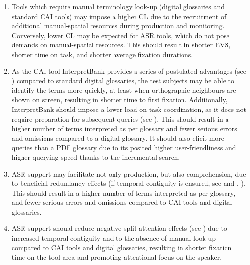 \begin{enumerate}
    \sloppy
    \item Tools which require manual terminology look-up (digital glossaries and standard CAI tools) may impose a higher CL due to the recruitment of additional manual-spatial resources during production and monitoring. Conversely, lower CL may be expected for ASR tools, which do not pose demands on manual-spatial resources. This should result in shorter EVS, shorter time on task, and shorter average fixation durations.
    \item As the CAI tool InterpretBank provides a series of postulated advantages (see ) compared to standard digital glossaries, the test subjects may be able to identify the terms more quickly, at least when orthographic neighbours are shown on screen, resulting in shorter time to first fixation. Additionally, InterpretBank should impose a lower load on task coordination, as it does not require preparation for subsequent queries (see ). This should result in a higher number of terms interpreted as per glossary and fewer serious errors and omissions compared to a digital glossary. It should also elicit more queries than a PDF glossary due to its posited higher user-friendliness and higher querying speed thanks to the incremental search.
    \item ASR support may facilitate not only production, but also comprehension, due to beneficial redundancy effects (if temporal contiguity is ensured, see  and \citealt{seeber_when_2020}, \citealt{chmiel_multimodal_2020}). This should result in a higher number of terms interpreted as per glossary, and fewer serious errors and omissions compared to CAI tools and digital glossaries.
    \item ASR support should reduce negative split attention effects (see ) due to increased temporal contiguity and to the absence of manual look-up compared to CAI tools and digital glossaries, resulting in shorter fixation time on the tool area and promoting attentional focus on the speaker.
\end{enumerate}


